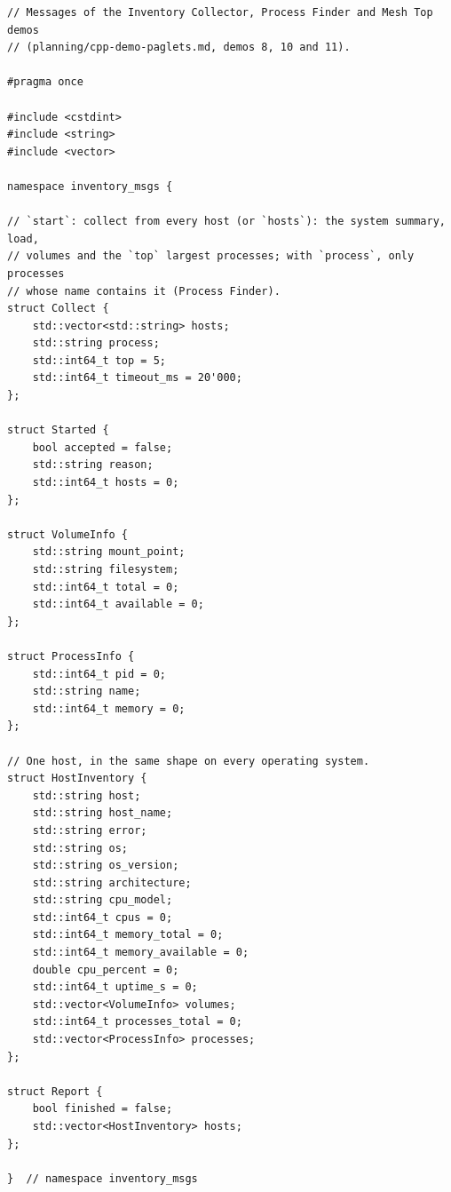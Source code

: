 \begin{lstlisting}[style=paglets-cpp,caption={The inventory's messages and report \src{cpp/examples/inventory/inventory\_msgs.hpp}},label={lst:app-inventory-messages}]
// Messages of the Inventory Collector, Process Finder and Mesh Top demos
// (planning/cpp-demo-paglets.md, demos 8, 10 and 11).

#pragma once

#include <cstdint>
#include <string>
#include <vector>

namespace inventory_msgs {

// `start`: collect from every host (or `hosts`): the system summary, load,
// volumes and the `top` largest processes; with `process`, only processes
// whose name contains it (Process Finder).
struct Collect {
    std::vector<std::string> hosts;
    std::string process;
    std::int64_t top = 5;
    std::int64_t timeout_ms = 20'000;
};

struct Started {
    bool accepted = false;
    std::string reason;
    std::int64_t hosts = 0;
};

struct VolumeInfo {
    std::string mount_point;
    std::string filesystem;
    std::int64_t total = 0;
    std::int64_t available = 0;
};

struct ProcessInfo {
    std::int64_t pid = 0;
    std::string name;
    std::int64_t memory = 0;
};

// One host, in the same shape on every operating system.
struct HostInventory {
    std::string host;
    std::string host_name;
    std::string error;
    std::string os;
    std::string os_version;
    std::string architecture;
    std::string cpu_model;
    std::int64_t cpus = 0;
    std::int64_t memory_total = 0;
    std::int64_t memory_available = 0;
    double cpu_percent = 0;
    std::int64_t uptime_s = 0;
    std::vector<VolumeInfo> volumes;
    std::int64_t processes_total = 0;
    std::vector<ProcessInfo> processes;
};

struct Report {
    bool finished = false;
    std::vector<HostInventory> hosts;
};

}  // namespace inventory_msgs
\end{lstlisting}

